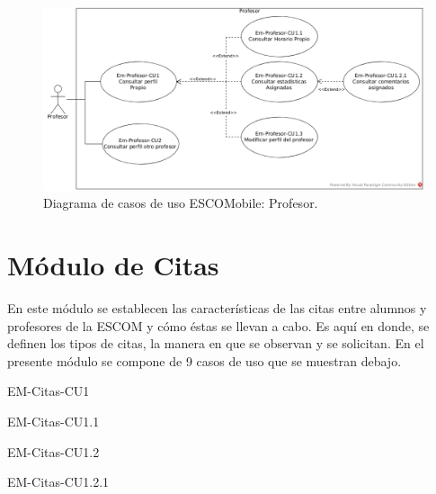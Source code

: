 \begin{figure}[htbp!]
	\centering
	\includegraphics[width=1\textwidth]{images/casos/profesor}
	\caption{Diagrama de casos de uso ESCOMobile: Profesor.}
\end{figure}




\section{Módulo de Citas}

\noindent
En este módulo se establecen las características de las citas entre alumnos y profesores de la ESCOM
y cómo éstas se llevan a cabo. Es aquí en donde, se definen los tipos de citas, la manera en que se observan
y se solicitan. En el presente módulo se compone de 9 casos de uso que se muestran debajo. 

\begin{requisitos}{EM-Citas-CU1}
\end{requisitos}

\begin{requisitos}{EM-Citas-CU1.1}
\end{requisitos}

\begin{requisitos}{EM-Citas-CU1.2}
\end{requisitos}

\begin{requisitos}{EM-Citas-CU1.2.1}
\end{requisitos}

